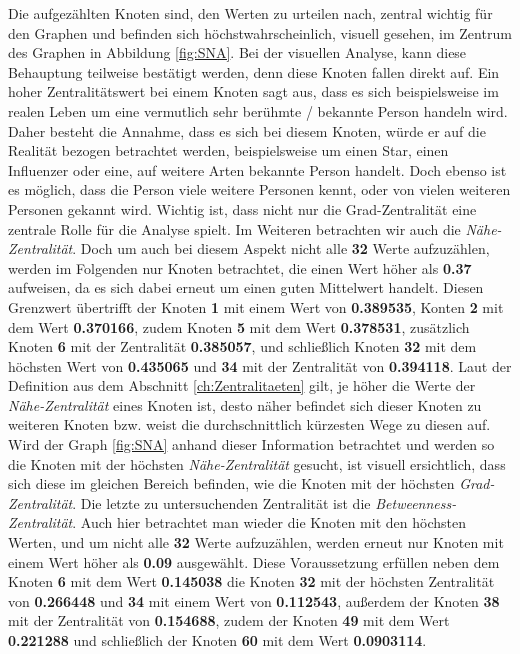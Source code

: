 Die aufgezählten Knoten sind, den Werten zu urteilen nach, zentral wichtig für den Graphen und befinden sich höchstwahrscheinlich, visuell gesehen, im Zentrum des Graphen in Abbildung \ref{fig:SNA}. Bei der visuellen Analyse, kann diese Behauptung teilweise bestätigt werden, denn diese Knoten fallen direkt auf. Ein hoher Zentralitätswert bei einem Knoten sagt aus, dass es sich beispielsweise im realen Leben um eine vermutlich sehr berühmte / bekannte Person handeln wird. Daher besteht die Annahme, dass es sich bei diesem Knoten, würde er auf die Realität bezogen betrachtet werden, beispielsweise um einen Star, einen Influenzer oder eine, auf weitere Arten bekannte Person handelt. Doch ebenso ist es möglich, dass die Person viele weitere Personen kennt, oder von vielen weiteren Personen gekannt wird. Wichtig ist, dass nicht nur die Grad-Zentralität eine zentrale Rolle für die Analyse spielt. Im Weiteren betrachten wir auch die \textit{Nähe-Zentralität}. Doch um auch bei diesem Aspekt nicht alle \textbf{32} Werte aufzuzählen, werden im Folgenden nur Knoten betrachtet, die einen Wert höher als \textbf{0.37} aufweisen, da es sich dabei erneut um einen guten Mittelwert handelt. Diesen Grenzwert übertrifft der Knoten \textbf{1} mit einem Wert von \textbf{0.389535}, Konten \textbf{2} mit dem Wert \textbf{0.370166}, zudem Knoten \textbf{5} mit dem Wert \textbf{0.378531}, zusätzlich Knoten \textbf{6} mit der Zentralität \textbf{0.385057}, und schließlich Knoten \textbf{32} mit dem höchsten Wert von \textbf{0.435065} und \textbf{34} mit der Zentralität von \textbf{0.394118}. Laut der Definition aus dem Abschnitt \ref{ch:Zentralitaeten} gilt, je höher die Werte der \textit{Nähe-Zentralität} eines Knoten ist, desto näher befindet sich dieser Knoten zu weiteren Knoten bzw. weist die durchschnittlich kürzesten Wege zu diesen auf. \\

Wird der Graph \ref{fig:SNA} anhand dieser Information betrachtet und werden so die Knoten mit der höchsten \textit{Nähe-Zentralität} gesucht, ist visuell ersichtlich, dass sich diese im gleichen Bereich befinden, wie die Knoten mit der höchsten \textit{Grad-Zentralität}. Die letzte zu untersuchenden Zentralität ist die \textit{Betweenness-Zentralität}. Auch hier betrachtet man wieder die Knoten mit den höchsten Werten, und um nicht alle \textbf{32} Werte aufzuzählen, werden erneut nur Knoten mit einem Wert höher als \textbf{0.09} ausgewählt. Diese Voraussetzung erfüllen neben dem Knoten \textbf{6} mit dem Wert \textbf{0.145038} die Knoten \textbf{32} mit der höchsten Zentralität von \textbf{0.266448} und \textbf{34} mit einem Wert von \textbf{0.112543}, außerdem der Knoten \textbf{38} mit der Zentralität von \textbf{0.154688}, zudem der Knoten \textbf{49} mit dem Wert \textbf{0.221288} und schließlich der Knoten \textbf{60} mit dem Wert \textbf{0.0903114}. 

